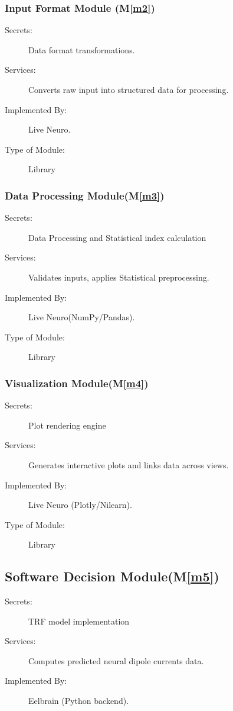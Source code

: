 \documentclass[12pt, titlepage]{article}
\newcommand{\mref}[1]{M\ref{#1}}
\begin{document}
\subsubsection{Input Format Module (\mref{m2})}

\begin{description}
\item[Secrets:]Data format transformations.
\item[Services:]Converts raw input into structured data for processing.
\item[Implemented By:] Live Neuro.
\item[Type of Module:] Library
\end{description}

\subsubsection{Data Processing Module(\mref{m3})}

\begin{description}
\item[Secrets:]Data Processing and Statistical index calculation
\item[Services:]Validates inputs, applies Statistical preprocessing.
\item[Implemented By:] Live Neuro(NumPy/Pandas).
\item[Type of Module:] Library
\end{description}

\subsubsection{Visualization Module(\mref{m4})}

\begin{description}
\item[Secrets:] Plot rendering engine
\item[Services:]Generates interactive plots and links data across views.
\item[Implemented By:] Live Neuro (Plotly/Nilearn).
\item[Type of Module:] Library
\end{description}

\subsection{Software Decision Module(\mref{m5})}

\begin{description}
\item[Secrets:]  TRF model implementation
\item[Services:] Computes predicted neural dipole currents data.
\item[Implemented By:] Eelbrain (Python backend).
\end{description}
\end{document}
